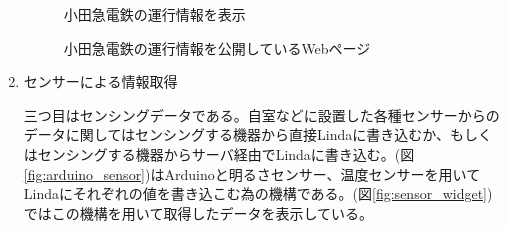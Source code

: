 \begin{enumerate}
\begin{figure}[htbp]
  \begin{minipage}{\hsize}
    \begin{center}
    \end{center}
    \caption{小田急電鉄の運行情報を表示}
    \label{fig:odakyu_widget}
  \end{minipage}
\end{figure}

\begin{figure}[htbp]
  \begin{minipage}{\hsize}
    \begin{center}
    \end{center}
    \caption{小田急電鉄の運行情報を公開しているWebページ}
    \label{fig:odakyu_page}
  \end{minipage}
\end{figure}

 \item センサーによる情報取得

三つ目はセンシングデータである。自室などに設置した各種センサーからのデータに関してはセンシングする機器から直接Lindaに書き込むか、もしくはセンシングする機器からサーバ経由でLindaに書き込む。(図\ref{fig:arduino_sensor})はArduinoと明るさセンサー、温度センサーを用いてLindaにそれぞれの値を書き込こむ為の機構である。(図\ref{fig:sensor_widget})ではこの機構を用いて取得したデータを表示している。


\end{enumerate}
